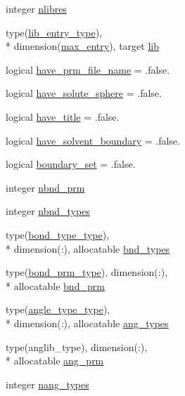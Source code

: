 \begin{DoxyCompactItemize}
\item 
integer \hyperlink{classprep_a45b6e35c6833923457375f4d56f0f5b5}{nlibres}
\item 
type(\hyperlink{structprep_1_1lib__entry__type}{lib\-\_\-entry\-\_\-type}), \\*
dimension(\hyperlink{classprep_ac8c3b3f850c904ceb431889c42d85ee2}{max\-\_\-entry}), target \hyperlink{classprep_a8d289afb3f6d89fbade57a991736cdbc}{lib}
\item 
logical \hyperlink{classprep_af4d8bdabfcb632efdd69f7f9459d4cb1}{have\-\_\-prm\-\_\-file\-\_\-name} = .false.
\item 
logical \hyperlink{classprep_ae5fc82378da688778b62b1855f535646}{have\-\_\-solute\-\_\-sphere} = .false.
\item 
logical \hyperlink{classprep_aef51fe5ef8e99e94ce6215e4862693ab}{have\-\_\-title} = .false.
\item 
logical \hyperlink{classprep_a8c26fbee1c34fbb32339ce304880a6fb}{have\-\_\-solvent\-\_\-boundary} = .false.
\item 
logical \hyperlink{classprep_a7a6bd6d143339e8bfd4eca5c729d53fc}{boundary\-\_\-set} = .false.
\item 
integer \hyperlink{classprep_a9956f590e2211602a6e5ec0fc78ac75e}{nbnd\-\_\-prm}
\item 
integer \hyperlink{classprep_a2308de44ae31622b6609e54cd66291da}{nbnd\-\_\-types}
\item 
type(\hyperlink{structprep_1_1bond__type__type}{bond\-\_\-type\-\_\-type}), \\*
dimension(\-:), allocatable \hyperlink{classprep_a8612d16f438fce2fdfab421435fc12b0}{bnd\-\_\-types}
\item 
type(\hyperlink{structprep_1_1bond__prm__type}{bond\-\_\-prm\-\_\-type}), dimension(\-:), \\*
allocatable \hyperlink{classprep_ac427697c7ffa6252f064c2203abbc8d1}{bnd\-\_\-prm}
\item 
type(\hyperlink{structprep_1_1angle__type__type}{angle\-\_\-type\-\_\-type}), \\*
dimension(\-:), allocatable \hyperlink{classprep_a35c47c52d6cde56a3edbbad318eb0735}{ang\-\_\-types}
\item 
type(anglib\-\_\-type), dimension(\-:), \\*
allocatable \hyperlink{classprep_a29c0f063e1579b1087d6e9bd35d11f9f}{ang\-\_\-prm}
\item 
integer \hyperlink{classprep_a13fc2319ab89b1b88b8fd6a130e08c4e}{nang\-\_\-types}
\item 

\end{DoxyCompactItemize}
